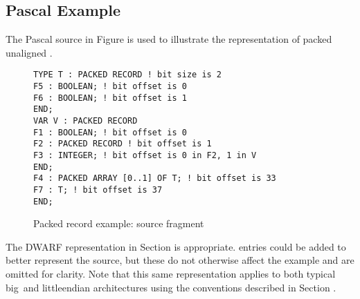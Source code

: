 \subsection{Pascal Example}
\label{app:pascalexample}

The Pascal source in 
Figure 
is used to illustrate the representation of packed unaligned
.
\begin{figure}[here]
\begin{lstlisting}
TYPE T : PACKED RECORD ! bit size is 2
F5 : BOOLEAN; ! bit offset is 0
F6 : BOOLEAN; ! bit offset is 1
END;
VAR V : PACKED RECORD
F1 : BOOLEAN; ! bit offset is 0
F2 : PACKED RECORD ! bit offset is 1
F3 : INTEGER; ! bit offset is 0 in F2, 1 in V
END;
F4 : PACKED ARRAY [0..1] OF T; ! bit offset is 33
F7 : T; ! bit offset is 37
END;
\end{lstlisting}
\caption{Packed record example: source fragment} \label{fig:packedrecordexamplesourcefragment}
\end{figure}

The DWARF representation in 
Section  
is
appropriate. 
 entries could be added to
better represent the source, but these do not otherwise affect
the example and are omitted for clarity. Note that this same
representation applies to both typical big\dash \ and 
little\dash endian
architectures using the conventions described in 
Section .


